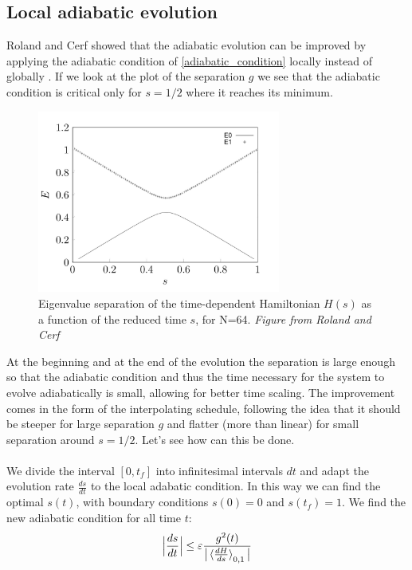     \subsection{Local adiabatic evolution}
    Roland and Cerf showed that the adiabatic evolution can be improved by applying the adiabatic condition of \cref{adiabatic_condition} locally instead of globally \cite{Roland2002}. If we look at the plot of the separation $g$ we see that the adiabatic condition is critical only for $s=1/2$ where it reaches its minimum.
    \begin{figure}[h]
      \centering
      \includegraphics[width=80mm]{figures/chapter1/separation}
      \caption[Eigenvalue separation of the time-dependent Hamiltonian $H(s)$ as a function of the reduced time $s$, for N=64]{Eigenvalue separation of the time-dependent Hamiltonian $H(s)$ as a function of the reduced time $s$, for N=64. \textit{Figure from Roland and Cerf} \cite{Roland2002}}
      \label{separation_figure}
    \end{figure}
    At the beginning and at the end of the evolution the separation is large enough so that the adiabatic condition and thus the time necessary for the system to evolve adiabatically is small, allowing for better time scaling. The improvement comes in the form of the interpolating schedule, following the idea that it should be steeper for large separation $g$ and flatter (more than linear) for small separation around $s=1/2$. Let's see how can this be done. \\ \\
    We divide the interval $[0,t_f]$ into infinitesimal intervals $dt$ and adapt the evolution rate $\frac{ds}{dt}$ to the local adabatic condition. In this way we can find the optimal $s(t)$, with boundary conditions $s(0)=0$ and $s(t_f)=1$. We find the new adiabatic condition for all time $t$:
    \begin{equation}
      \Big|\frac{ds}{dt}\Big|\leq\varepsilon\frac{g^2(t)}{\big|\braket{\frac{dH}{ds}}_{0,1}\big|}
    \end{equation}
